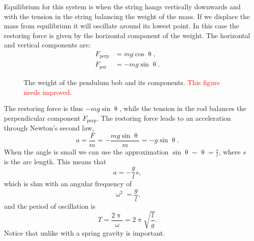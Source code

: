 \documentclass[a4paper,12pt]{book}
\begin{document}
Equilibrium for this system is when the string hangs vertically downwards and with the tension in the string balancing the weight of the mass. If we displace the mass from equilibrium it will oscillate around its lowest point. In this case the restoring force is given by the horizontal component of the weight. The horizontal and vertical components are:
\begin{align*}
F_{\text{perp}}&=mg\cos\uptheta,\\
F_{\text{par}}&=-mg\sin\uptheta.
\end{align*}

\begin{figure}[ht]
    \centering
    \caption{The weight of the pendulum bob and its components. \textcolor{red}{This figure needs improved.}}
    \label{fig: weight components}
\end{figure}

The restoring force is thus $-mg\sin\uptheta$, while the tension in the rod balances the perpendicular component $F_{\text{perp}}$.  The restoring force leads to an acceleration through Newton's second law,
\begin{equation*}
a=\frac{F}{m}=-\frac{mg\sin\uptheta}{m}=-g\sin\uptheta.
\end{equation*}
When the angle is small we can use the approximation $\sin\uptheta\sim\uptheta=\frac{s}{l}$, where $s$ is the arc length. This means that
\begin{equation*}
a=-\frac{g}{l}s,
\end{equation*}
which is shm with an angular frequency of 
\begin{equation}
\upomega^{2}=\frac{g}{l},
\label{eq: pendulum frequency}
\end{equation}
and the period of oscillation is
\begin{equation}
T=\frac{2\uppi}{\upomega}=2\uppi\sqrt{\frac{l}{g}}.
\label{eq: pendulum period}
\end{equation}
Notice that unlike with a spring gravity is important.\\
\end{document}
